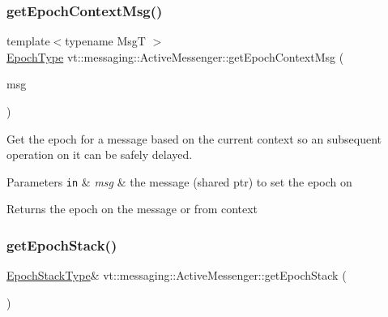 \subsubsection{\texorpdfstring{get\+Epoch\+Context\+Msg()}{getEpochContextMsg()}\hspace{0.1cm}{\footnotesize\ttfamily [2/2]}}
{\footnotesize\ttfamily template$<$typename MsgT $>$ \\
\hyperlink{namespacevt_a81d11b28122d43bf9834577e4a06440f}{Epoch\+Type} vt\+::messaging\+::\+Active\+Messenger\+::get\+Epoch\+Context\+Msg (\begin{DoxyParamCaption}\item[{\hyperlink{structvt_1_1messaging_1_1_msg_shared_ptr}{Msg\+Shared\+Ptr}$<$ MsgT $>$ const \&}]{msg }\end{DoxyParamCaption})\hspace{0.3cm}{\ttfamily [inline]}}



Get the epoch for a message based on the current context so an subsequent operation on it can be safely delayed. 


\begin{DoxyParams}[1]{Parameters}
\mbox{\tt in}  & {\em msg} & the message (shared ptr) to set the epoch on\\
\hline
\end{DoxyParams}
\begin{DoxyReturn}{Returns}
the epoch on the message or from context 
\end{DoxyReturn}
\mbox{\label{structvt_1_1messaging_1_1_active_messenger_ab8a39ba3f4bf5ed737fb69cb2e448456}} 
\subsubsection{\texorpdfstring{get\+Epoch\+Stack()}{getEpochStack()}}
{\footnotesize\ttfamily \hyperlink{structvt_1_1messaging_1_1_active_messenger_a746358029c37dabf2b4c8ad26642aee9}{Epoch\+Stack\+Type}\& vt\+::messaging\+::\+Active\+Messenger\+::get\+Epoch\+Stack (\begin{DoxyParamCaption}{ }\end{DoxyParamCaption})\hspace{0.3cm}{\ttfamily [inline]}}



